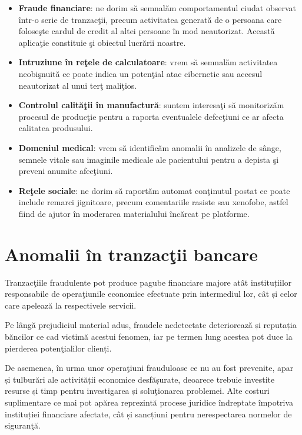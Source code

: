 \begin{itemize}
    \item \textbf{Fraude financiare}: ne dorim să semnalăm comportamentul ciudat 
    observat într-o serie de tranzacţii, precum activitatea generată de 
    o persoana care foloseşte cardul de credit al altei persoane în mod 
    neautorizat. Această aplicaţie constituie şi obiectul lucrării noastre\cite{financial-fraud}.
    \item \textbf{Intruziune în reţele de calculatoare}: vrem să semnalăm activitatea
    neobişnuită ce poate indica un potenţial atac cibernetic sau accesul 
    neautorizat al unui terţ maliţios\cite{network-traffic}.
    \item \textbf{Controlul calităţii în manufactură}: suntem interesaţi să monitorizăm 
    procesul de producţie pentru a raporta eventualele defecţiuni ce ar afecta 
    calitatea produsului\cite{quality-control}.
    \item \textbf{Domeniul medical}: vrem să identificăm anomalii în analizele de sânge, 
    semnele vitale sau imaginile medicale ale pacientului pentru a depista şi preveni
    anumite afecţiuni\cite{medical-images}.
    \item \textbf{Reţele sociale}: ne dorim să raportăm automat conţinutul postat ce 
    poate include remarci jignitoare, precum comentariile rasiste sau xenofobe,
    astfel fiind de ajutor în moderarea materialului încărcat pe platforme\cite{social-media}. 
\end{itemize}

\section{Anomalii în tranzacţii bancare}

Tranzacţiile fraudulente pot produce pagube financiare majore 
atât instituțiilor responsabile de operaţiunile economice 
efectuate prin intermediul lor, cât și celor care apelează
la respectivele servicii. 

Pe lângă prejudiciul material adus,
fraudele nedetectate deteriorează și reputația băncilor 
ce cad victimă acestui fenomen, iar pe termen lung acestea
pot duce la pierderea potenţialilor clienți.

De asemenea, în urma unor operaţiuni frauduloase ce nu au 
fost prevenite, apar și tulburări ale activității economice
desfășurate, deoarece trebuie investite resurse și timp 
pentru investigarea și soluţionarea problemei. Alte costuri
suplimentare ce mai pot apărea reprezintă procese juridice 
îndreptate împotriva instituției financiare afectate, cât și 
sancțiuni pentru nerespectarea normelor de siguranţă.

